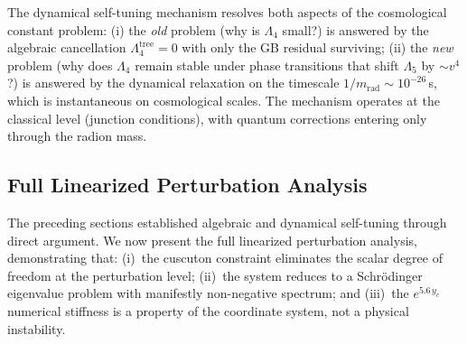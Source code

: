 \begin{remark}
The dynamical self-tuning mechanism resolves both aspects of the cosmological constant problem: (i) the \emph{old} problem (why is $\Lambda_4$ small?) is answered by the algebraic cancellation $\Lambda_4^{\mathrm{tree}} = 0$ with only the GB residual surviving; (ii) the \emph{new} problem (why does $\Lambda_4$ remain stable under phase transitions that shift $\Lambda_5$ by $\sim v^4$?) is answered by the dynamical relaxation on the timescale $1/m_{\mathrm{rad}} \sim 10^{-26}\,$s, which is instantaneous on cosmological scales. The mechanism operates at the classical level (junction conditions), with quantum corrections entering only through the radion mass.
\end{remark}


\subsection{Full Linearized Perturbation Analysis}
\label{sec:1-linearized-stability}

The preceding sections established algebraic and dynamical self-tuning through direct argument. We now present the full linearized perturbation analysis, demonstrating that: (i)~the cuscuton constraint eliminates the scalar degree of freedom at the perturbation level; (ii)~the system reduces to a Schr\"{o}dinger eigenvalue problem with manifestly non-negative spectrum; and (iii)~the $e^{5.6\,y_c}$ numerical stiffness is a property of the coordinate system, not a physical instability.

